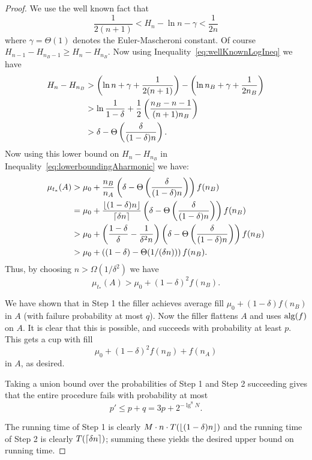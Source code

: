 \begin{proof}
  We use the well known fact that 
  \begin{equation}
    \label{eq:wellKnownLogIneq}
    \frac{1}{2(n+1)} < H_n - \ln n - \gamma < \frac{1}{2n}
  \end{equation}
  where $\gamma = \Theta(1)$ denotes the Euler-Mascheroni constant.
  Of course $H_{n-1}-H_{n_B-1} \ge H_n - H_{n_B}.$ Now using
  Inequality~\eqref{eq:wellKnownLogIneq} we have
  \begin{align*}
    H_n - H_{n_B} &> \left( \ln n + \gamma + \frac{1}{2(n+1)} \right) - \left( \ln n_B + \gamma + \frac{1}{2n_B} \right)\\
                  &> \ln \frac{1}{1-\delta} + \frac{1}{2}\left( \frac{n_B-n-1}{(n+1)n_B} \right)\\
                  &> \delta - \Theta\left( \frac{\delta}{(1-\delta)n} \right).
  \end{align*}
  Now using this lower bound on $H_n - H_{n_B}$ in
  Inequality~\eqref{eq:lowerboundingAharmonic} we have:
  \begin{align*}
    \mu_{t_*}(A) &> \mu_0 + \frac{n_B}{n_A}\left( \delta - \Theta\left( \frac{\delta}{(1-\delta)n} \right) \right)f(n_B)\\
                 &= \mu_0 + \frac{\left\lfloor (1-\delta)n \right\rfloor}{\left\lceil \delta n \right\rceil}\left( \delta - \Theta\left( \frac{\delta}{(1-\delta)n} \right) \right)f(n_B)\\
                 &> \mu_0 + \left( \frac{1-\delta}{\delta} - \frac{1}{\delta^2 n} \right)\left( \delta - \Theta\left( \frac{\delta}{(1-\delta)n} \right) \right)f(n_B)\\
                 &> \mu_0 + \left( (1-\delta) - \Theta(1/(\delta n)) \right)f(n_B).
  \end{align*}
  Thus, by choosing $n > \Omega(1/\delta^2)$ we have 
  $$\mu_{t_*}(A) > \mu_0 + (1-\delta)^2 f(n_B).$$

We have shown that in Step 1 the filler achieves average fill
$\mu_0 + (1-\delta)f(n_B)$ in $A$ (with failure probability at
most $q$).
Now the filler flattens $A$ and uses $\operatorname{\text{\textup{alg}}}(f)$ on $A$.
It is clear that this is possible, and succeeds with probability
at least $p$.
This gets a cup with fill 
$$\mu_0 + (1-\delta)^2 f(n_B) + f(n_A)$$
in $A$, as desired.

Taking a union bound over the probabilities of Step 1 and Step 2
succeeding gives that the entire procedure fails with probability
at most 
$$p' \le p + q = 3p + 2^{-\lg^8 N}.$$

The running time of Step 1 is clearly $M\cdot n\cdot
T(\left\lfloor (1-\delta)n \right\rfloor)$ and the running time of Step 2 is clearly
$T(\left\lceil \delta n \right\rceil)$; summing these yields the desired upper
bound on running time.

\end{proof}

